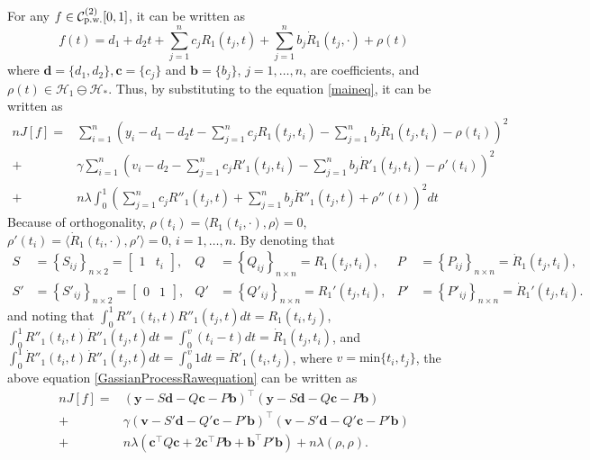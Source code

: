 For any $f\in\mathcal{C}_{\mbox{\scriptsize p.w.}}^{(2)}[0,1]$, it can be written as 
\begin{equation}\label{GaussianProcessFunctionF}
f(t)=d_1+d_2t+\sum_{j=1}^{n}c_jR_1(t_j,t)+\sum_{j=1}^{n}b_j\dot{R}_1(t_j,\cdot) +\rho(t)
\end{equation}
where $\mathbf{d}=\lbrace d_1,d_2\rbrace,\mathbf{c}=\lbrace c_j\rbrace$ and $\mathbf{b}=\lbrace b_j\rbrace$, $j=1,\ldots,n$, are coefficients, and $\rho(t) \in \mathcal{H}_1 \ominus \mathcal{H}_*$. Thus, by substituting to the equation \eqref{maineq}, it can be written as 
\begin{equation}\label{GassianProcessRawequation}
\begin{split}
nJ[f]=&\sum_{i=1}^n \left( y_i - d_1-d_2t-\sum_{j=1}^{n}c_jR_1(t_j,t_i)-\sum_{j=1}^{n}b_j\dot{R}_1(t_j,t_i)-\rho(t_i) \right) ^2\\
+&\gamma\sum_{i=1}^n \left( v_i - d_2-\sum_{j=1}^{n}c_jR'_1(t_j,t_i)-\sum_{j=1}^{n}b_j\dot{R}'_1(t_j,t_i)-\rho'(t_i) \right) ^2\\
+&n\lambda \int_0^1 \left( \sum_{j=1}^{n}c_jR''_1(t_j,t)+\sum_{j=1}^{n}b_j\dot{R}''_1(t_j,t)+\rho''(t)\right)^2dt
\end{split}
\end{equation}
Because of orthogonality, $\rho(t_i) = \langle R_1(t_i,\cdot),\rho\rangle=0$, $\rho'(t_i) = \langle\dot{R}_1(t_i,\cdot),\rho'\rangle=0$, $i=1,\ldots,n$. By denoting that 
\begin{align*}
S&=\left\lbrace S_{ij} \right\rbrace_{n\times 2}=\begin{bmatrix}1 & t_i \end{bmatrix} ,& Q&=\left\lbrace Q_{ij} \right\rbrace_{n\times n}= R_1(t_j,t_i), & P&=\left\lbrace P_{ij} \right\rbrace_{n\times n}= \dot{R}_1(t_j,t_i), \\
S'&=\left\lbrace S'_{ij} \right\rbrace_{n\times 2}=\begin{bmatrix} 0 & 1 \end{bmatrix} ,& Q'&=\left\lbrace Q'_{ij} \right\rbrace_{n\times n}= R_1'(t_j,t_i), & P'&=\left\lbrace P'_{ij} \right\rbrace_{n\times n}= \dot{R}_1'(t_j,t_i). 
\end{align*}
and noting that $\int_0^1R''_1(t_i,t)R''_1(t_j,t)dt=R_1(t_i,t_j)$, $\int_0^1R''_1(t_i,t)\dot{R}''_1(t_j,t)dt=\int_0^{v}(t_i-t)dt=\dot{R}_1(t_j,t_i)$, and $\int_0^1\dot{R}''_1(t_i,t)\dot{R}''_1(t_j,t)dt=\int_0^{v}1dt=\dot{R}'_1(t_i,t_j)$, where $v=\mbox{min}\lbrace t_i,t_j\rbrace$, the above equation \eqref{GassianProcessRawequation} can be written as 
\begin{equation}\label{matriteq}
\begin{split}
nJ[f]=&\left(\mathbf{y}-S\mathbf{d}-Q\mathbf{c}-P\mathbf{b}\right)^\top \left(\mathbf{y}-S\mathbf{d}-Q\mathbf{c}-P\mathbf{b}\right)\\
+&\gamma\left(\mathbf{v}-S'\mathbf{d}-Q'\mathbf{c}-P'\mathbf{b}\right)^\top \left(\mathbf{v}-S'\mathbf{d}-Q'\mathbf{c}-P'\mathbf{b}\right)\\
+&n\lambda \left(\mathbf{c}^\top Q\mathbf{c} + 2\mathbf{c}^\top P\mathbf{b}+ \mathbf{b}^\top P'\mathbf{b}\right)+n\lambda\left(\rho,\rho\right).
\end{split}
\end{equation}
